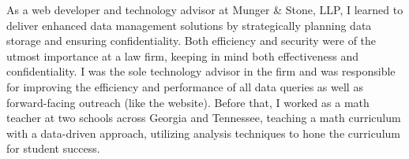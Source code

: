 


As a web developer and technology advisor at Munger \& Stone, LLP, I learned to deliver enhanced data management solutions by strategically planning data storage and ensuring confidentiality. Both efficiency and security were of the utmost importance at a law firm, keeping in mind both effectiveness and confidentiality. I was the sole technology advisor in the firm and was responsible for improving the efficiency and performance of all data queries as well as forward-facing outreach (like the website). Before that, I worked as a math teacher at two schools across Georgia and Tennessee, teaching a math curriculum with a data-driven approach, utilizing analysis techniques to hone the curriculum for student success.
